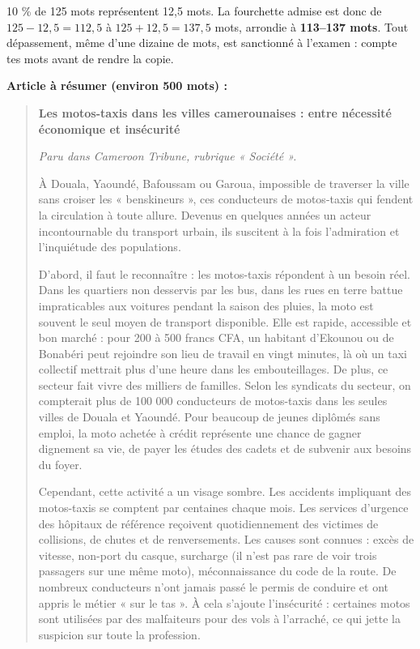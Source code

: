 \documentclass[11pt]{article}
\begin{document}
\begin{attention}
10 \% de 125 mots représentent 12,5 mots. La fourchette admise est donc de $125 - 12{,}5 = 112{,}5$ à $125 + 12{,}5 = 137{,}5$ mots, arrondie à \textbf{113--137 mots}. Tout dépassement, même d'une dizaine de mots, est sanctionné à l'examen : compte tes mots avant de rendre la copie.
\end{attention}

\textbf{Article à résumer (environ 500 mots) :}

\begin{quote}
\textbf{Les motos-taxis dans les villes camerounaises : entre nécessité économique et insécurité}

\emph{Paru dans Cameroon Tribune, rubrique « Société ».}

À Douala, Yaoundé, Bafoussam ou Garoua, impossible de traverser la ville sans croiser les « benskineurs », ces conducteurs de motos-taxis qui fendent la circulation à toute allure. Devenus en quelques années un acteur incontournable du transport urbain, ils suscitent à la fois l'admiration et l'inquiétude des populations.

D'abord, il faut le reconnaître : les motos-taxis répondent à un besoin réel. Dans les quartiers non desservis par les bus, dans les rues en terre battue impraticables aux voitures pendant la saison des pluies, la moto est souvent le seul moyen de transport disponible. Elle est rapide, accessible et bon marché : pour 200 à 500 francs CFA, un habitant d'Ekounou ou de Bonabéri peut rejoindre son lieu de travail en vingt minutes, là où un taxi collectif mettrait plus d'une heure dans les embouteillages. De plus, ce secteur fait vivre des milliers de familles. Selon les syndicats du secteur, on compterait plus de 100 000 conducteurs de motos-taxis dans les seules villes de Douala et Yaoundé. Pour beaucoup de jeunes diplômés sans emploi, la moto achetée à crédit représente une chance de gagner dignement sa vie, de payer les études des cadets et de subvenir aux besoins du foyer.

Cependant, cette activité a un visage sombre. Les accidents impliquant des motos-taxis se comptent par centaines chaque mois. Les services d'urgence des hôpitaux de référence reçoivent quotidiennement des victimes de collisions, de chutes et de renversements. Les causes sont connues : excès de vitesse, non-port du casque, surcharge (il n'est pas rare de voir trois passagers sur une même moto), méconnaissance du code de la route. De nombreux conducteurs n'ont jamais passé le permis de conduire et ont appris le métier « sur le tas ». À cela s'ajoute l'insécurité : certaines motos sont utilisées par des malfaiteurs pour des vols à l'arraché, ce qui jette la suspicion sur toute la profession.


\end{quote}
\end{document}
